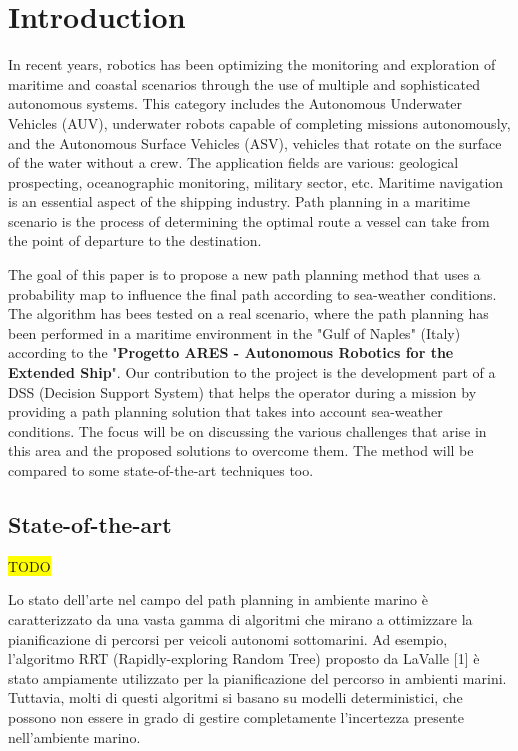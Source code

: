 \documentclass[journal,article,submit,pdftex,moreauthors]{Definitions/mdpi}
\begin{document}

\section{Introduction}
In recent years, robotics has been optimizing the monitoring and exploration of maritime and coastal scenarios through the use of multiple and sophisticated autonomous systems. 
This category includes the Autonomous Underwater Vehicles (AUV), underwater robots capable of completing missions autonomously, and the Autonomous Surface Vehicles (ASV), vehicles that rotate on the surface of the water without a crew. The application fields are various: geological prospecting, oceanographic monitoring, military sector, etc. 
Maritime navigation is an essential aspect of the shipping industry. Path planning in a maritime scenario is the process of determining the optimal route a vessel can take from the point of departure to the destination. 

The goal of this paper is to propose a new path planning method that uses a probability map to influence the final path according to sea-weather conditions.
The algorithm has bees tested on a real scenario, where the path planning has been performed in a maritime environment in the "Gulf of Naples" (Italy) according to 
the "\textbf{Progetto ARES - Autonomous Robotics for the Extended Ship}".
Our contribution to the project is the development part of a DSS (Decision Support System) that helps the operator during a mission by providing a path planning solution 
that takes into account sea-weather conditions.
The focus will be on discussing the various challenges that arise in this area and the proposed solutions to overcome them. 
The method will be compared to some state-of-the-art techniques too.


\subsection{State-of-the-art}
\colorbox{yellow}{TODO}

Lo stato dell'arte nel campo del path planning in ambiente marino è caratterizzato da una vasta gamma di algoritmi che mirano a ottimizzare la pianificazione di percorsi per veicoli autonomi sottomarini. Ad esempio, l'algoritmo RRT (Rapidly-exploring Random Tree) proposto da LaValle [1] è stato ampiamente utilizzato per la pianificazione del percorso in ambienti marini. Tuttavia, molti di questi algoritmi si basano su modelli deterministici, che possono non essere in grado di gestire completamente l'incertezza presente nell'ambiente marino.
\end{document}
